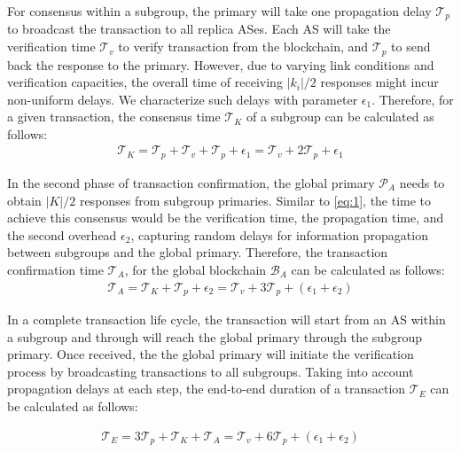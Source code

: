\documentclass[5p]{elsarticle}
\begin{document}
For consensus within a subgroup, the primary will take one propagation delay $\mathcal{T}_{p}$ to broadcast the transaction to all replica ASes. Each AS will take the verification time $\mathcal{T}_{v}$ to verify transaction from the blockchain, and $\mathcal{T}_{p}$ to send back the response to the primary. However, due to varying link conditions and verification capacities, the overall time of receiving $|k_{i}|/2$ responses might incur non-uniform delays. We characterize such delays with parameter  $\epsilon_{1}$. Therefore, for a given transaction, the consensus time $\mathcal{T}_{K}$ of a subgroup can be calculated as follows: 
\begin{align} \label{eq:1}
    \mathcal{T}_{K} = \mathcal{T}_{p} +  \mathcal{T}_{v} + \mathcal{T}_{p} + \epsilon_{1} = \mathcal{T}_{v} + 2\mathcal{T}_{p} + \epsilon_{1}
\end{align}


In the second phase of transaction confirmation, the global primary $\mathcal{P}_{A}$ needs to obtain $|K|/2$ responses from subgroup primaries. Similar to \autoref{eq:1}, the time to achieve this consensus would be the verification time, the propagation time, and the second overhead $\epsilon_{2}$, capturing random delays for information propagation between subgroups and the global primary. Therefore, the transaction confirmation time $\mathcal{T}_{A}$, for the global blockchain $\mathcal{B}_{A}$ can be calculated as follows:
\begin{align}\label{eq:2}
    \mathcal{T}_{A} = \mathcal{T}_{K}+ \mathcal{T}_{p}+\epsilon_{2} = \mathcal{T}_{v} + 3\mathcal{T}_{p} + (\epsilon_{1}+\epsilon_{2})
\end{align}



In a complete transaction life cycle, the transaction will start from an AS within a subgroup and through will reach the global primary through the subgroup primary. Once received, the the global primary will initiate the verification process by broadcasting transactions to all subgroups. Taking into account propagation delays at each step, the end-to-end duration of a transaction $\mathcal{T}_{E}$ can be calculated as follows: 

\begin{align}\label{eq:3}
    \mathcal{T}_{E} = 3\mathcal{T}_{p} +\mathcal{T}_{K}+ \mathcal{T}_{A} = \mathcal{T}_{v} + 6\mathcal{T}_{p} + (\epsilon_{1}+\epsilon_{2})
\end{align}

 
\end{document}

